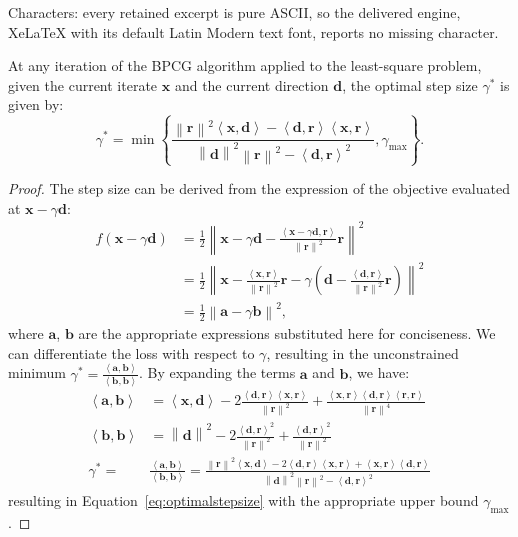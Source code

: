 \documentclass[10pt,a4paper]{amsart}
\newcommand{\innp}[2]{\left\langle #1, #2 \right\rangle}
\newcommand{\norm}[1]{\left\| #1 \right\|}
\newcommand{\vd}{\mathbf{d}}
\newcommand{\vr}{\mathbf{r}}
\newcommand{\vx}{\mathbf{x}}
\begin{document}
Characters: every retained excerpt is pure ASCII, so the delivered engine, XeLaTeX with its default Latin Modern text font, reports no missing character.
\begin{proposition}
At any iteration of the BPCG algorithm applied to the least-square problem, given the current iterate $\vx$ and the current direction $\vd$,
the optimal step size $\gamma^*$ is given by:
\begin{equation}\label{eq:optimalstepsize}
\gamma^* = \min \left\{\frac{ \norm{\vr}^2 \innp{\vx}{\vd} - \innp{\vd}{\vr} \innp{\vx}{\vr} }{ \norm{\vd}^2 \norm{\vr}^2 - \innp{\vd}{\vr}^2 }, \gamma_{\max} \right\}.
\end{equation}
\end{proposition}

\begin{proof}
The step size can be derived from the expression of the objective evaluated at $\vx - \gamma \vd$:
\begin{align*}
    f(\vx - \gamma \vd) & = \frac{1}{2} \left\| \vx - \gamma \vd - \frac{\innp{\vx - \gamma \vd}{\vr}}{\norm{\vr}^2} \vr \right\|^2 \\
    & = \frac12 \left\| \vx - \frac{\innp{\vx}{\vr}}{\norm{\vr}^2} \vr - \gamma \left(\vd - \frac{\innp{\vd}{\vr}}{\norm{\vr}^2} \vr\right) \right\|^2 \\
    &= \frac12 \left\| \mathbf{a} - \gamma \mathbf{b} \right\|^2,
\end{align*}
where $\mathbf{a}$, $\mathbf{b}$ are the appropriate expressions substituted here for conciseness.
We can differentiate the loss with respect to $\gamma$, resulting in the unconstrained minimum $\gamma^* = \frac{\innp{\mathbf{a}}{\mathbf{b}}}{\innp{\mathbf{b}}{\mathbf{b}}}$.
By expanding the terms $\mathbf{a}$ and $\mathbf{b}$, we have:
\begin{align*}
    \innp{\mathbf{a}}{\mathbf{b}} &= \innp{\vx}{\vd} - 2 \frac{\innp{\vd}{\vr} \innp{\vx}{\vr}}{\norm{\vr}^2} + \frac{\innp{\vx}{\vr} \innp{\vd}{\vr} \innp{\vr}{\vr}}{\norm{\vr}^4} \\
    \innp{\mathbf{b}}{\mathbf{b}} &= \norm{\vd}^2 - 2 \frac{\innp{\vd}{\vr}^2}{\norm{\vr}^2} + \frac{\innp{\vd}{\vr}^2}{\norm{\vr}^2} \\
    \gamma^* =& \frac{\innp{\mathbf{a}}{\mathbf{b}}}{\innp{\mathbf{b}}{\mathbf{b}}} = \frac{\norm{\vr}^2 \innp{\vx}{\vd} - 2\innp{\vd}{\vr}\innp{\vx}{\vr} + \innp{\vx}{\vr}\innp{\vd}{\vr}}{\norm{\vd}^2 \norm{\vr}^2 - \innp{\vd}{\vr}^2}
\end{align*}
resulting in Equation~\eqref{eq:optimalstepsize} with the appropriate upper bound $\gamma_{\max}$.
\end{proof}
\end{document}
